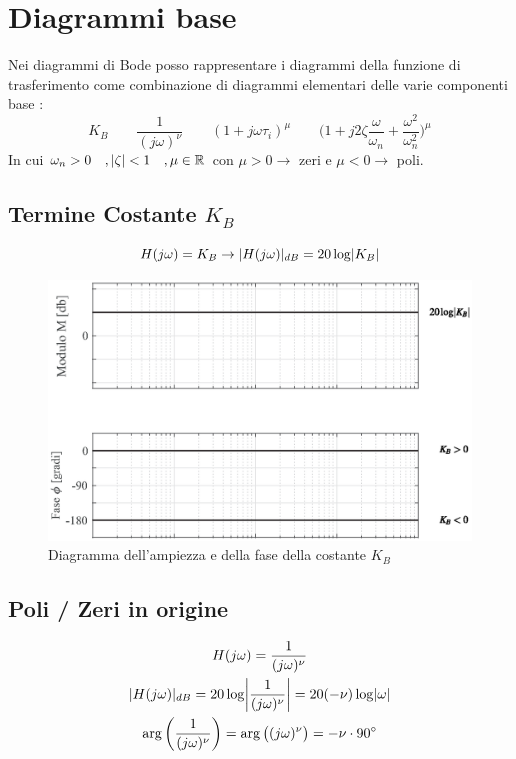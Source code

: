 \section{Diagrammi base}
   
   Nei diagrammi di Bode posso rappresentare i diagrammi della funzione di trasferimento come combinazione di diagrammi elementari delle varie componenti base :
\[ %
	K_B \qquad 
	\frac{1}{(j\omega)^\nu} \qquad 
	(1+j\omega\tau_i)^{\mu} \qquad 
	\Big(1+j2\zeta\frac{\omega}{\omega_{n}}+\frac{\omega^2}{\omega^{2}_{n}} \Big)^{\mu}
\]
In cui $ \omega_n > 0 \quad ,\lvert\zeta\rvert<1 \quad,\mu \in \mathbb{R} $ con $ \mu > 0 \rightarrow$ zeri e $ \mu < 0 \rightarrow$ poli.

\subsection{Termine Costante $ K_B $} 
\[ H(j\omega) = K_B \rightarrow \lvert H(j\omega)\rvert_{dB} = 20 \log \lvert K_B\rvert \]
\begin{figure}[H]
	\centering
	\includegraphics[width=0.8\linewidth]{immagini/cap6_Bode/bodeCost.eps}
	\caption{ Diagramma dell'ampiezza e della fase della costante $  K_B $ }
	\label{fig:bodeCost}
\end{figure}

\subsection{Poli / Zeri in origine}

\begin{gather*}
	H(j\omega) = \frac{1}{(j\omega)^\nu}\\
	\abs{H(j\omega)}_{dB} = 20 \log \Abs{\frac{1}{(j\omega)^\nu}} = 20 ( -\nu) \log \abs{\omega} \\
	\arg \bigg(\frac{1}{(j\omega)^\nu}\bigg) = \arg \big((j\omega)^{\nu}\big) = -\nu \cdot \ang{90} 
\end{gather*}

